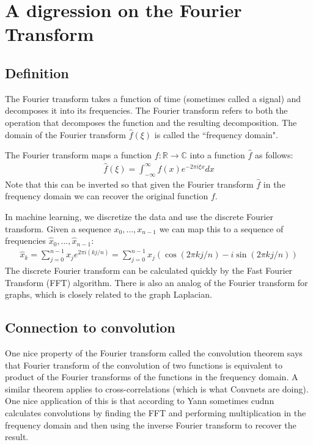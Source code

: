 \chapter{A digression on the Fourier Transform}

\section{Definition}

The Fourier transform takes a function of time (sometimes called a signal) and decomposes it into its frequencies. The Fourier transform refers to both the operation that decomposes the function and the resulting decomposition. The domain of the Fourier transform $\hat{f}(\xi)$ is called the ``frequency domain".

The Fourier transform maps a function $ f: \mathbb{R} \to  \mathbb{C}$ into a function $\hat f$ as follows:
\begin{align}
    \hat f(\xi) = \int_{-\infty}^\infty f(x) e^{-2\pi i \xi x}dx
\end{align}
Note that this can be inverted so that given the Fourier transform $ \hat f $ in the frequency domain we can recover the original function $ f$.

In machine learning, we discretize the data and use the discrete Fourier transform. Given a sequence $x_0,\dots, x_{n-1}$ we can map this to a sequence of frequencies $ \hat x_0,\dots, \hat x_{n-1}$:
\begin{align}
    \hat x_k = \sum_{j=0}^{n-1} x_j e^{2\pi i (kj/n)} = \sum_{j=0}^{n-1} x_j (\cos(2\pi kj/n) - i\sin(2\pi kj/n))
\end{align}
The discrete Fourier transform can be calculated quickly by the Fast Fourier Transform (FFT) algorithm. There is also an analog of the Fourier transform for graphs, which is closely related to the graph Laplacian.

\section{Connection to convolution}
One nice property of the Fourier transform called the convolution theorem says that Fourier transform of the convolution of two functions is equivalent to product of the Fourier transforms of the functions in the frequency domain.
A similar theorem applies to cross-correlations (which is what Convnets are doing).
One nice application of this is that according to Yann sometimes cudnn calculates convolutions by finding the FFT and performing multiplication in the frequency domain and then using the inverse Fourier transform to recover the result.